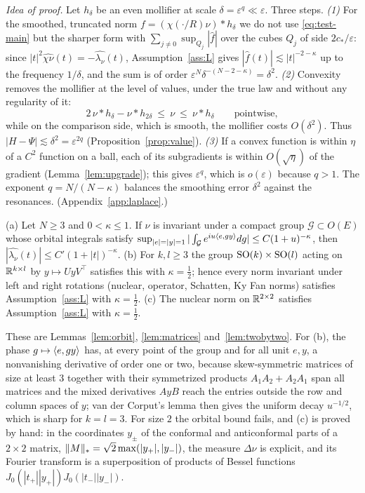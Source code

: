 \documentclass[anon,12pt]{colt2026}
\begin{document}
\noindent\emph{Idea of proof.} Let $h_\delta$ be an even mollifier at scale $\delta=\varepsilon^{q}\ll\varepsilon$. Three
steps. \emph{(1)} For the smoothed, truncated norm $f=(\chi(\cdot/R)\nu)*h_\delta$ we do not use \eqref{eq:test-main} but
the sharper form with $\sum_{j\ne0}\sup_{Q_j}|\widehat f|$ over the cubes $Q_j$ of side $2c_\ast/\varepsilon$: since
$|t|^2\widehat{\chi\nu}(t)=-\widehat{\lambda_\nu}(t)$, Assumption~\ref{ass:L} gives $|\widehat f(t)|\lesssim|t|^{-2-\kappa}$
up to the frequency $1/\delta$, and the sum is of order $\varepsilon^{N}\delta^{-(N-2-\kappa)}=\delta^2$. \emph{(2)} Convexity
removes the mollifier at the level of values, under the true law and without any regularity of it:
\begin{equation}\label{eq:sandwich-main}
2\,\nu*h_\delta-\nu*h_{2\delta}\ \le\ \nu\ \le\ \nu*h_\delta\qquad\text{pointwise},
\end{equation}
while on the comparison side, which is smooth, the mollifier costs $O(\delta^2)$. Thus
$|H-\Psi|\lesssim\delta^2=\varepsilon^{2q}$ (Proposition~\ref{prop:value}). \emph{(3)} If a convex function is within
$\eta$ of a $C^2$ function on a ball, each of its subgradients is within $O(\sqrt\eta)$ of the gradient
(Lemma~\ref{lem:upgrade}); this gives $\varepsilon^{q}$, which is $o(\varepsilon)$ because $q>1$. The exponent
$q=N/(N-\kappa)$ balances the smoothing error $\delta^2$ against the resonances. (Appendix~\ref{app:laplace}.)

\begin{lemma}\label{lem:sym-main}
\textup{(a)} Let $N\ge3$ and $0<\kappa\le1$. If $\nu$ is invariant under a compact group $\mathcal G\subset O(E)$ whose orbital integrals satisfy
$\sup_{|e|=|y|=1}|\int_{\mathcal G}e^{iu\langle e, gy\rangle}dg|\le C(1+u)^{-\kappa}$, then $|\widehat{\lambda_\nu}(t)|\le C'(1+|t|)^{-\kappa}$.
\textup{(b)} For $k,l\ge3$ the group $\mathrm{SO}(k)\times\mathrm{SO}(l)$ acting on $\mathbb{R}^{k\times l}$ by $y\mapsto UyV^\top$ satisfies this
with $\kappa=\frac12$; hence every norm invariant under left and right rotations (nuclear, operator, Schatten, Ky Fan
norms) satisfies Assumption~\ref{ass:L} with $\kappa=\frac12$. \textup{(c)} The nuclear norm on $\mathbb{R}^{2\times2}$ satisfies
Assumption~\ref{ass:L} with $\kappa=\frac12$.
\end{lemma}

These are Lemmas~\ref{lem:orbit}, \ref{lem:matrices} and~\ref{lem:twobytwo}. For (b), the phase
$g\mapsto\langle e, gy\rangle$ has, at every point of the group and for all unit $e,y$, a nonvanishing derivative of order one
or two, because skew-symmetric matrices of size at least $3$ together with their symmetrized products $A_1A_2+A_2A_1$ span
all matrices and the mixed
derivatives $AyB$ reach the entries outside the row and column spaces of $y$; van der Corput's lemma then gives the
uniform decay $u^{-1/2}$, which is sharp for $k=l=3$. For size $2$ the orbital bound fails, and (c) is proved by hand:
in the coordinates $y_\pm$ of the conformal and anticonformal parts of a $2\times2$ matrix,
$\|M\|_{*}=\sqrt2\max(|y_+|,|y_-|)$, the measure $\Delta\nu$ is explicit, and its Fourier transform is a superposition of
products of Bessel functions $J_0(|t_+||y_+|)J_0(|t_-||y_-|)$.
\end{document}
